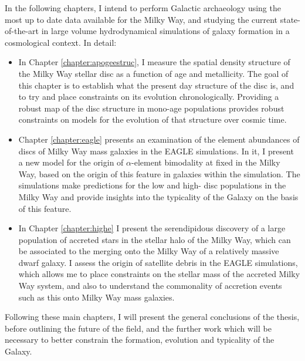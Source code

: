 In the following chapters, I intend to perform Galactic archaeology using the most up to date data available for the Milky Way, and studying the current state-of-the-art in large volume hydrodynamical simulations of galaxy formation in a cosmological context. In detail:
\begin{itemize}
    \item In Chapter \ref{chapter:apogeestruc}, I measure the spatial density structure of the Milky Way stellar disc as a function of age and metallicity. The goal of this chapter is to establish what the present day structure of the disc is, and to try and place constraints on its evolution chronologically. Providing a robust map of the disc structure in mono-age populations provides robust constraints on models for the evolution of that structure over cosmic time.
    \item Chapter \ref{chapter:eagle} presents an examination of the element abundances of discs of Milky Way mass galaxies in the EAGLE simulations. In it, I present a new model for the origin of $\alpha$-element bimodality at fixed \feh{} in the Milky Way, based on the origin of this feature in galaxies within the simulation. The simulations make predictions for the low and high-\afe{} disc populations in the Milky Way and provide insights into the typicality of the Galaxy on the basis of this feature.
    \item In Chapter \ref{chapter:highe} I present the serendipidous discovery of a large population of accreted stars in the stellar halo of the Milky Way, which can be associated to the merging onto the Milky Way of a relatively massive dwarf galaxy. I assess the origin of satellite debris in the EAGLE simulations, which allows me to place constraints on the stellar mass of the accreted Milky Way system, and also to understand the commonality of accretion events such as this onto Milky Way mass galaxies.
\end{itemize}
Following these main chapters, I will present the general conclusions of the thesis, before outlining the future of the field, and the further work which will be necessary to better constrain the formation, evolution and typicality of the Galaxy.




